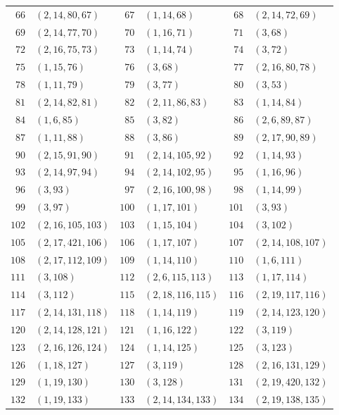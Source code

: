 {\begin{longtable}{@{}rl@{\qquad}rl@{\qquad}rl@{}}
\(66\)&\((2,14,80,67)\) & \(67\)&\((1,14,68)\) & \(68\)&\((2,14,72,69)\)\\
\(69\)&\((2,14,77,70)\) & \(70\)&\((1,16,71)\) & \(71\)&\((3,68)\)\\
\(72\)&\((2,16,75,73)\) & \(73\)&\((1,14,74)\) & \(74\)&\((3,72)\)\\
\(75\)&\((1,15,76)\) & \(76\)&\((3,68)\) & \(77\)&\((2,16,80,78)\)\\
\(78\)&\((1,11,79)\) & \(79\)&\((3,77)\) & \(80\)&\((3,53)\)\\
\(81\)&\((2,14,82,81)\) & \(82\)&\((2,11,86,83)\) & \(83\)&\((1,14,84)\)\\
\(84\)&\((1,6,85)\) & \(85\)&\((3,82)\) & \(86\)&\((2,6,89,87)\)\\
\(87\)&\((1,11,88)\) & \(88\)&\((3,86)\) & \(89\)&\((2,17,90,89)\)\\
\(90\)&\((2,15,91,90)\) & \(91\)&\((2,14,105,92)\) & \(92\)&\((1,14,93)\)\\
\(93\)&\((2,14,97,94)\) & \(94\)&\((2,14,102,95)\) & \(95\)&\((1,16,96)\)\\
\(96\)&\((3,93)\) & \(97\)&\((2,16,100,98)\) & \(98\)&\((1,14,99)\)\\
\(99\)&\((3,97)\) & \(100\)&\((1,17,101)\) & \(101\)&\((3,93)\)\\
\(102\)&\((2,16,105,103)\) & \(103\)&\((1,15,104)\) & \(104\)&\((3,102)\)\\
\(105\)&\((2,17,421,106)\) & \(106\)&\((1,17,107)\) & \(107\)&\((2,14,108,107)\)\\
\(108\)&\((2,17,112,109)\) & \(109\)&\((1,14,110)\) & \(110\)&\((1,6,111)\)\\
\(111\)&\((3,108)\) & \(112\)&\((2,6,115,113)\) & \(113\)&\((1,17,114)\)\\
\(114\)&\((3,112)\) & \(115\)&\((2,18,116,115)\) & \(116\)&\((2,19,117,116)\)\\
\(117\)&\((2,14,131,118)\) & \(118\)&\((1,14,119)\) & \(119\)&\((2,14,123,120)\)\\
\(120\)&\((2,14,128,121)\) & \(121\)&\((1,16,122)\) & \(122\)&\((3,119)\)\\
\(123\)&\((2,16,126,124)\) & \(124\)&\((1,14,125)\) & \(125\)&\((3,123)\)\\
\(126\)&\((1,18,127)\) & \(127\)&\((3,119)\) & \(128\)&\((2,16,131,129)\)\\
\(129\)&\((1,19,130)\) & \(130\)&\((3,128)\) & \(131\)&\((2,19,420,132)\)\\
\(132\)&\((1,19,133)\) & \(133\)&\((2,14,134,133)\) & \(134\)&\((2,19,138,135)\)\\

\end{longtable}}
